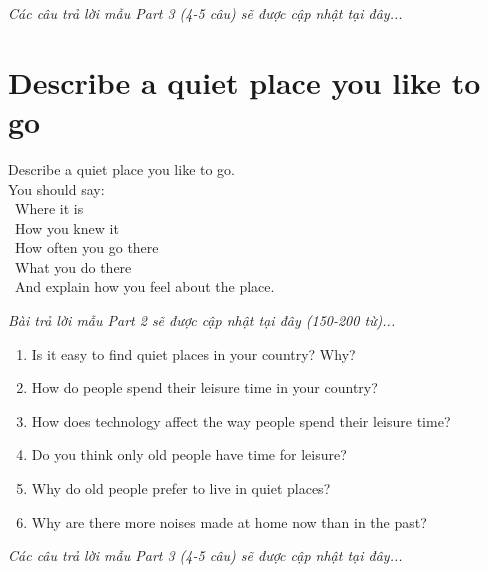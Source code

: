 \vspace{1em}
\textit{Các câu trả lời mẫu Part 3 (4-5 câu) sẽ được cập nhật tại đây...}
\vspace{2em}

\section{Describe a quiet place you like to go}
\begin{ieltsprompt}
Describe a quiet place you like to go. \\
You should say: \\
\textbullet\ Where it is \\
\textbullet\ How you knew it \\
\textbullet\ How often you go there \\
\textbullet\ What you do there \\
\textbullet\ And explain how you feel about the place. \\
\end{ieltsprompt}

\vspace{1em}
\textit{Bài trả lời mẫu Part 2 sẽ được cập nhật tại đây (150-200 từ)...}
\vspace{2em}

\begin{ieltsprompt}
\begin{enumerate}[itemsep=4pt]
    \item Is it easy to find quiet places in your country? Why?
    \item How do people spend their leisure time in your country?
    \item How does technology affect the way people spend their leisure time?
    \item Do you think only old people have time for leisure?
    \item Why do old people prefer to live in quiet places?
    \item Why are there more noises made at home now than in the past?
\end{enumerate}
\end{ieltsprompt}

\vspace{1em}
\textit{Các câu trả lời mẫu Part 3 (4-5 câu) sẽ được cập nhật tại đây...}
\vspace{2em}

